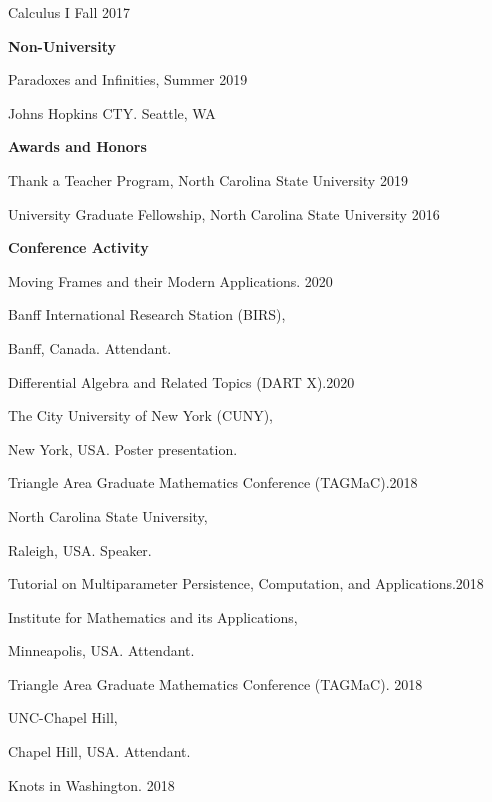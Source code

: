 \documentclass{article}
\begin{document}
Calculus I \hfill Fall 2017

\medskip
\medskip
\textsf{\textbf{Non-University}}

\medskip
Paradoxes and Infinities, \hfill Summer 2019

Johns Hopkins CTY. Seattle, WA 

\bigskip
\bigskip

\textsf{\textbf{\Large Awards and Honors}\hrulefill}

\medskip
Thank a Teacher Program, North Carolina State University \hfill 2019

\medskip
University Graduate Fellowship, North Carolina State University \hfill 2016

%
%
\bigskip
\bigskip

\textsf{\textbf{\Large Conference Activity} \hrulefill}

\medskip
Moving Frames and their Modern Applications. \hfill 2020 

Banff International Research Station (BIRS), 

Banff, Canada. Attendant.

\medskip
Differential Algebra and Related Topics (DART X).\hfill 2020

The City University of New York (CUNY), 

New York, USA. Poster presentation.

\medskip
Triangle Area Graduate Mathematics Conference (TAGMaC).\hfill 2018

North Carolina State University,  

 Raleigh, USA. Speaker.

\medskip
Tutorial on Multiparameter Persistence, Computation, and Applications.\hfill 2018 

Institute for Mathematics and its Applications, 

Minneapolis, USA.  Attendant.

\medskip
Triangle Area Graduate Mathematics Conference (TAGMaC).  \hfill 2018

UNC-Chapel Hill,

Chapel Hill, USA.  Attendant.

\medskip
Knots in Washington. \hfill 2018
\end{document}
